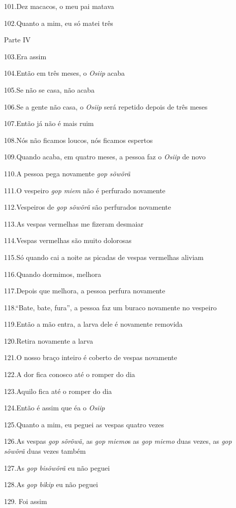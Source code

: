 101.Dez macacos, o meu pai matava

102.Quanto a mim, eu só matei três

Parte IV

103.Era assim

104.Então em três meses, o \emph{Osiip} acaba

105.Se não se casa, não acaba

106.Se a gente não casa, o \emph{Osiip} será repetido depois de três
meses

107.Então já não é mais ruim

108.Nós não ficamos loucos, nós ficamos espertos

109.Quando acaba, em quatro meses, a pessoa faz o \emph{Osiip} de novo

110.A pessoa pega novamente \emph{gop sõwõrã}

111.O vespeiro \emph{gop miem} não é perfurado novamente

112.Vespeiros de \emph{gop sõwõrã} são perfurados novamente

113.As vespas vermelhas me fizeram desmaiar

114.Vespas vermelhas são muito dolorosas

115.Só quando cai a noite as picadas de vespas vermelhas aliviam

116.Quando dormimos, melhora

117.Depois que melhora, a pessoa perfura novamente

118.``Bate, bate, fura'', a pessoa faz um buraco novamente no vespeiro

119.Então a mão entra, a larva dele é novamente removida

120.Retira novamente a larva

121.O nosso braço inteiro é coberto de vespas novamente

122.A dor fica conosco até o romper do dia

123.Aquilo fica até o romper do dia

124.Então é assim que éa o \emph{Osiip}

125.Quanto a mim, eu peguei as vespas quatro vezes

126.As vespas \emph{gop sõrõwã,} as \emph{gop miemo}s as \emph{gop
miemo} duas vezes, as \emph{gop sõwõrã} duas vezes também

127.As \emph{gop bisõwõrã} eu não peguei

128.As \emph{gop bikip} eu não peguei

129. Foi assim

